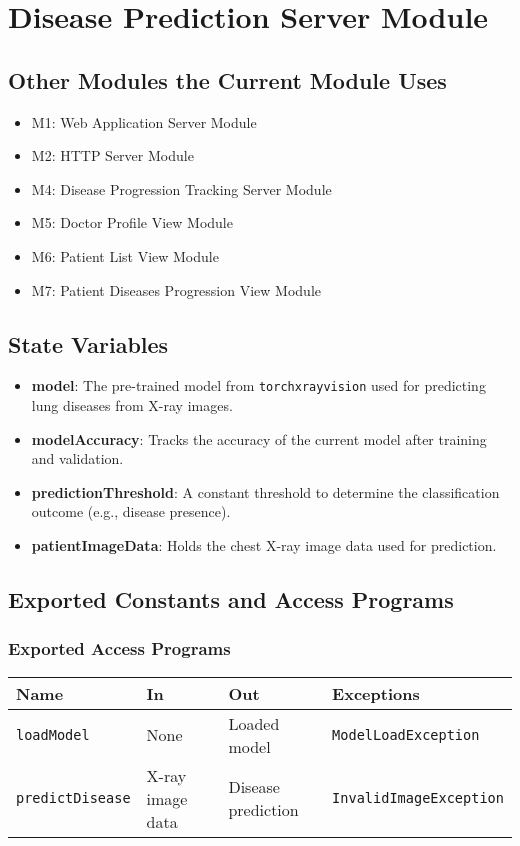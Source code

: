 \documentclass[12pt, titlepage]{article}
\begin{document}
\section{Disease Prediction Server Module}

\subsection{Other Modules the Current Module Uses}
\begin{itemize}
    \item M1: Web Application Server Module
    \item M2: HTTP Server Module
    \item M4: Disease Progression Tracking Server Module
    \item M5: Doctor Profile View Module
    \item M6: Patient List View Module
    \item M7: Patient Diseases Progression View Module
\end{itemize}

\subsection{State Variables}
\begin{itemize}
    \item \textbf{model}: The pre-trained model from \texttt{torchxrayvision} used for predicting lung diseases from X-ray images.
    \item \textbf{modelAccuracy}: Tracks the accuracy of the current model after training and validation.
    \item \textbf{predictionThreshold}: A constant threshold to determine the classification outcome (e.g., disease presence).
    \item \textbf{patientImageData}: Holds the chest X-ray image data used for prediction.
\end{itemize}

\subsection{Exported Constants and Access Programs}
\subsubsection{Exported Access Programs}
\begin{tabular}{|l|l|l|l|}
    \hline
    \textbf{Name} & \textbf{In} & \textbf{Out} & \textbf{Exceptions} \\
    \hline
    \texttt{loadModel} & None & Loaded model & \texttt{ModelLoadException} \\
    \texttt{predictDisease} & X-ray image data & Disease prediction & \texttt{InvalidImageException} \\
    \hline
\end{tabular}
\end{document}
